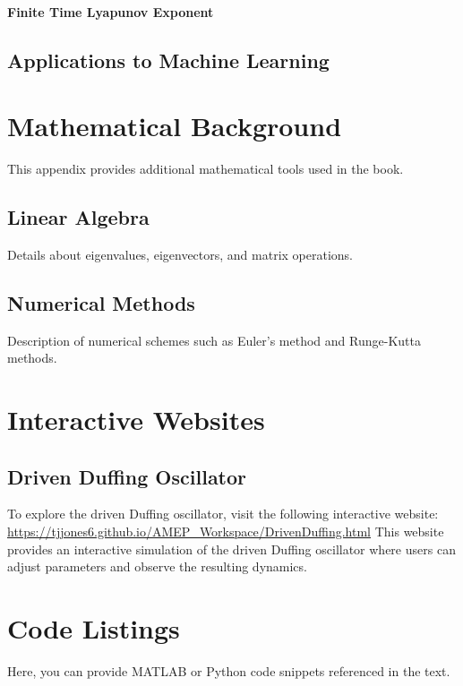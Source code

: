\documentclass{amsbook}
\begin{document}
\subsubsection{Finite Time Lyapunov Exponent}


\section{Applications to Machine Learning}

\appendix
\chapter{Mathematical Background}
This appendix provides additional mathematical tools used in the book.

\section{Linear Algebra}
Details about eigenvalues, eigenvectors, and matrix operations.

\section{Numerical Methods}
Description of numerical schemes such as Euler's method and Runge-Kutta methods.

\chapter{Interactive Websites}
\section{Driven Duffing Oscillator}
To explore the driven Duffing oscillator, visit the following interactive website:
\url{https://tjjones6.github.io/AMEP_Workspace/DrivenDuffing.html}
\noindent This website provides an interactive simulation of the driven Duffing oscillator where users can adjust parameters and observe the resulting dynamics.

\chapter{Code Listings}
Here, you can provide MATLAB or Python code snippets referenced in the text.
\end{document}
